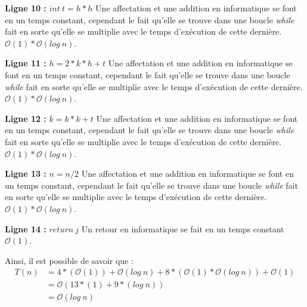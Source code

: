\documentclass[12pt]{article}
\begin{document}
        \noindent \textbf{Ligne 10 :} \( int \: t = h*h \) \newline
  	    Une affectation et une addition en informatique se font en un temps constant, cependant le fait qu'elle se trouve dans une boucle \textit{while} fait en sorte qu'elle se multiplie avec le temps d'exécution de cette dernière.
        \( \mathcal{O}(1)*\mathcal{O}(log \: n) \). \newline
        
        \noindent \textbf{Ligne 11 :} \( h = 2*k*h + t \) \newline
  	    Une affectation et une addition en informatique se font en un temps constant, cependant le fait qu'elle se trouve dans une boucle \textit{while} fait en sorte qu'elle se multiplie avec le temps d'exécution de cette dernière.
        \( \mathcal{O}(1)*\mathcal{O}(log \: n) \). \newline
        
        \noindent \textbf{Ligne 12 :} \( k = k*k + t \) \newline
  	    Une affectation et une addition en informatique se font en un temps constant, cependant le fait qu'elle se trouve dans une boucle \textit{while} fait en sorte qu'elle se multiplie avec le temps d'exécution de cette dernière.
        \( \mathcal{O}(1)*\mathcal{O}(log \: n) \). \newline
       
        \noindent \textbf{Ligne 13 :} \( n = n/2 \) \newline
  	    Une affectation et une addition en informatique se font en un temps constant, cependant le fait qu'elle se trouve dans une boucle \textit{while} fait en sorte qu'elle se multiplie avec le temps d'exécution de cette dernière.
        \( \mathcal{O}(1)*\mathcal{O}(log \: n) \). \newline
        
        \noindent \textbf{Ligne 14 :} \( return \: j \) \newline
  	    Un retour en informatique se fait en un temps constant
        \( \mathcal{O}(1) \). \newline

        \noindent Ainsi, il est possible de savoir que : 
	    \begin{align*}
	       T(n) &= 4*(\mathcal{O}(1))+\mathcal{O}(log \: n)+8*( \mathcal{O}(1)*\mathcal{O}(log \: n)) + \mathcal{O}(1) \\
	   	   &= \mathcal{O}(13*(1)+9*(log \: n)) \\
	       &= \mathcal{O}(log \: n)
	    \end{align*}
      
\end{document}
